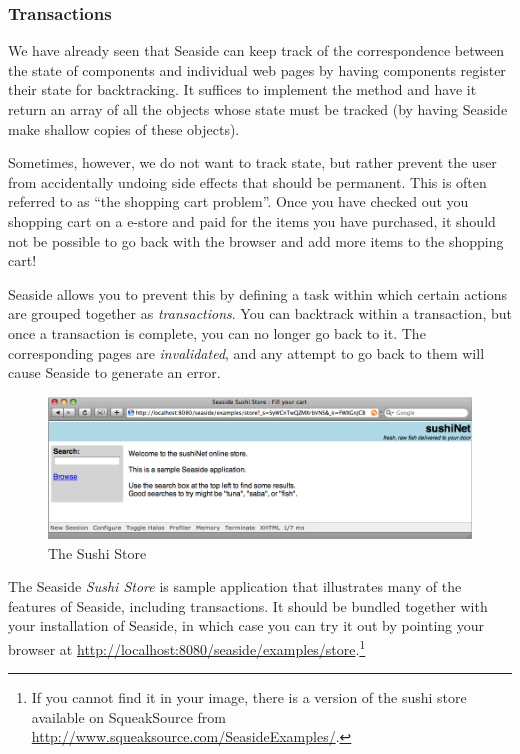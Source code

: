 \documentclass[a4paper,10pt,twoside]{book}
\begin{document}
\subsubsection{Transactions}

We have already seen that Seaside can keep track of the correspondence between the state of components and individual web pages by having components register their state for backtracking.
It suffices to implement the method  and have it return an array of all the objects whose state must be tracked (\ie by having Seaside make shallow copies of these objects).

Sometimes, however, we do not want to track state, but rather prevent the user from accidentally undoing side effects that should be permanent.
This is often referred to as ``the shopping cart problem''.
Once you have checked out you shopping cart on a e-store and paid for the items you have purchased, it should not be possible to go back with the browser and add more items to the shopping cart!

Seaside allows you to prevent this by defining a task within which certain actions are grouped together as \emph{transactions}.
You can backtrack within a transaction, but once a transaction is complete, you can no longer go back to it.
The corresponding pages are \emph{invalidated}, and any attempt to go back to them will cause Seaside to generate an error.

\begin{figure}[ht]
\begin{center}
\includegraphics[width=\textwidth]{sushiStore}
\caption{The Sushi Store}
\label{fig:sushiStore}
\end{center}
\end{figure}

The Seaside \emph{Sushi Store} is sample application that illustrates many of the features of Seaside, including transactions.
It should be bundled together with your installation of Seaside, in which case you can try it out by pointing your browser at
\url{http://localhost:8080/seaside/examples/store}.\footnote{If you cannot find it in your image, there is a version of the sushi store available on SqueakSource from \url{http://www.squeaksource.com/SeasideExamples/}.}
\end{document}
